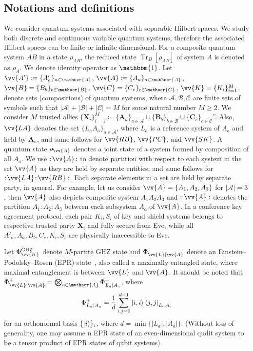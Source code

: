\documentclass[aps,pra,twocolumn,superscriptaddress,longbibliography]{revtex4-1}
\def\Tr{\operatorname{Tr}}
\def\GHZ{\operatorname{GHZ}}
\newcommand{\mc}[1]{\mathcal{#1}}
\newcommand{\tf}[1]{\textbf{#1}}
\newcommand{\msc}[1]{\mathscr{#1}}
\newcommand{\bbm}[1]{\mathbbm{#1}}
\begin{document}
\subsection{Notations and definitions}
We consider quantum systems associated with separable Hilbert spaces. We study both discrete and continuous variable quantum systems, therefore the associated Hilbert spaces can be finite or infinite dimensional. For a composite quantum system $AB$ in a state $\rho_{AB}$, the reduced state $\Tr_{B}[\rho_{AB}]$ of system $A$ is denoted as $\rho_A$. We denote identity operator as $\bbm{1}$. Let $\vv{A'}\coloneqq \{A_a'\}_{a\in\msc{A}}$, $\vv{A}\coloneqq \{A_a\}_{a\in\msc{A}}$, $\vv{B}=\{B_b\}_{b\in\msc{B}}$, $\vv{C}=\{C_c\}_{c\in\msc{C}}$, $\vv{K}=\{K_i\}_{i=1}^M$, denote sets (compositions) of quantum systems, where $\msc{A},\msc{B},\msc{C}$ are finite sets of symbols such that $|\mc{A}|+|\mc{B}|+|\mc{C}|=M$ for some natural number $M \geq 2$. We consider $M$ trusted allies $\{\tf{X}_i\}_{i=1}^M\coloneqq
\{\tf{A}_a\}_{a\in\mathscr{A}}\cup\{\tf{B}_b\}_{b\in\mathscr{B}}\cup\{\tf{C}_c\}_{c\in\mathscr{C
}}$”. Also, $\vv{LA}$ denotes the set $\{L_aA_a\}_{a\in\msc{A}}$, where $L_a$ is a reference system of $A_a$ and held by $\tf{A}_a$, and same follows for $\vv{RB}$, $\vv{PC}$, and $\vv{SK}$. A quantum state $\rho_{\vv{A}}$ denotes a joint state of a system formed by composition of all $A_a$. We use $:\!\vv{A}\!:$ to denote partition with respect to each system in the set $\vv{A}$ as they are held by separate entities, and same follows for $:\!\vv{LA}\!:\!\vv{RB}:$. Each separate elements in a set are held by separate party, in general. For example, let us consider $\vv{A}=\{A_1,A_2,A_3\}$ for $|\msc{A}|=3$, then $\vv{A}$ also depicts composite system $A_1A_2A_3$ and $:\vv{A}:$ denotes the partition $A_1:A_2:A_3$ between each subsystem $A_a$ of $\vv{A}$. In a conference key agreement protocol, each pair $K_i,S_i$ of key and shield systems belongs to respective trusted party $\tf{X}_i$ and fully secure from Eve, while all $A'_a,A_a,B_b,C_c,K_i,S_i$ are physically inaccessible to Eve. 


Let $\Phi^{\GHZ}_{\vv{K}}$ denote $M$-partite GHZ state and $\Phi^+_{\vv{L}|\vv{A}}$ denote an Einstein–Podolsky–Rosen (EPR) state~\cite{EPR35}, also called a maximally entangled state, where maximal entanglement is between $\vv{L}$ and $\vv{A}$. It should be noted that $\Phi^+_{\vv{L}|\vv{A}}=\bigotimes_{a\in\msc{A}}\Phi^+_{L_a|A_a}$, where
\begin{equation}
    \Phi^+_{L_a|A_a}=\frac{1}{d}\sum_{i,j=0}^{d-1}\ket{i,i}\bra{j,j}_{L_aA_a}
\end{equation}
for an orthonormal basis $\{\ket{i}\}_{i}$, where $d=\min\{|L_a|,|A_a|\}$. (Without loss of generality, one may assume n EPR state of an even-dimensional qudit system to be a tensor product of EPR states of qubit systems). 
\end{document}
